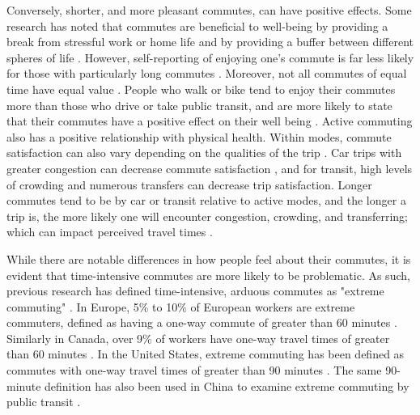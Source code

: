 \documentclass[10 pt,letterpaper]{article}
\begin{document}
Conversely, shorter, and more pleasant commutes, can have positive effects. Some research has noted that commutes are beneficial to well-being by providing a break from stressful work or home life and by providing a buffer between different spheres of life \cite{redmond_positive_2001,olsson_happiness_2013}. However, self-reporting of enjoying one's commute is far less likely for those with particularly long commutes \cite{chatterjee_commuting_2020,morris_are_2015}. Moreover, not all commutes of equal time have equal value \cite{hensher_value_1976}. People who walk or bike tend to enjoy their commutes more than those who drive or take public transit, and are more likely to state that their commutes have a positive effect on their well being \cite{martin_does_2014,st-louis_happy_2014}. Active commuting also has a positive relationship with physical health. Within modes, commute satisfaction can also vary depending on the qualities of the trip \cite{paez_enjoyment_2010}. Car trips with greater congestion can decrease commute satisfaction \cite{higgins_all_2018}, and for transit, high levels of crowding \cite{borjesson_satisfaction_2019} and numerous transfers \cite{st-louis_happy_2014} can decrease trip satisfaction. Longer commutes tend to be by car or transit relative to active modes, and the longer a trip is, the more likely one will encounter congestion, crowding, and transferring; which can impact perceived travel times \cite{tiznado2020understanding,tiznado-aitken_public_2021}.

While there are notable differences in how people feel about their commutes, it is evident that time-intensive commutes are more likely to be problematic. As such, previous research has defined time-intensive, arduous commutes as "extreme commuting" \cite{marion_comparison_2007,maoh_determinants_2012-1,vincent-geslin_determinants_2016,bai_exploring_2020}. In Europe, 5\% to 10\% of European workers are extreme commuters, defined as having a one-way commute of greater than 60 minutes \cite{vincent-geslin_determinants_2016}. Similarly in Canada, over 9\% of workers have one-way travel times of greater than 60 minutes \cite{government_of_canada_daily_2019}. In the United States, extreme commuting has been defined as commutes with one-way travel times of greater than 90 minutes \cite{marion_comparison_2007, bai_exploring_2020}. The same 90-minute definition has also been used in China to examine extreme commuting by public transit \cite{long_early_2016}.
\end{document}
